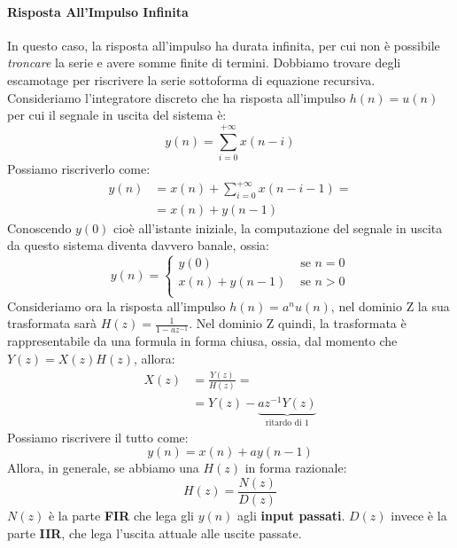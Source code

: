 \paragraph{Risposta All'Impulso Infinita}
In questo caso, la risposta all'impulso ha durata infinita, per cui non è possibile \textit{troncare} la serie e avere somme finite di termini.
Dobbiamo trovare degli escamotage per riscrivere la serie sottoforma di equazione recursiva.\\
Consideriamo l'integratore discreto che ha risposta all'impulso $h(n) = u(n)$ per cui il segnale in uscita del sistema è:
\begin{equation*}
    y(n) = \sum_{i = 0}^{+\infty}x(n - i)
\end{equation*}
Possiamo riscriverlo come:
\begin{align*}
    y(n) &= x(n) + \sum_{i = 0}^{+\infty}x(n - i -1) =\\
         &= x(n) + y(n - 1)
\end{align*}
Conoscendo $y(0)$ cioè all'istante iniziale, la computazione del segnale in uscita da questo sistema diventa davvero banale, ossia:
\begin{equation}
    y(n) = \begin{cases}
        y(0)    &\text{ se } n = 0\\
        x(n) + y(n - 1) &\text{ se } n > 0\\
    \end{cases}
\end{equation}
Consideriamo ora la risposta all'impulso $h(n) = a^n u(n)$, nel dominio Z la sua trasformata sarà $H(z) = \frac{1}{1 - az^{-1}}$. Nel dominio Z
quindi, la trasformata è rappresentabile da una formula in forma chiusa, ossia, dal momento che $Y(z) = X(z)H(z)$, allora:
\begin{align*}
    X(z) &= \frac{Y(z)}{H(z)} =\\
         &= Y(z) - \underbrace{az^{-1}Y(z)}_{\text{ritardo di 1}}
\end{align*}
Possiamo riscrivere il tutto come:
\begin{equation}
    y(n) = x(n) + ay(n-1)
\end{equation}
Allora, in generale, se abbiamo una $H(z)$ in forma razionale:
\begin{equation*}
    H(z) = \frac{N(z)}{D(z)}
\end{equation*}
$N(z)$ è la parte \textbf{FIR} che lega gli $y(n)$ agli \textbf{input passati}. $D(z)$ invece è la parte \textbf{IIR}, che lega l'uscita attuale alle uscite passate.
